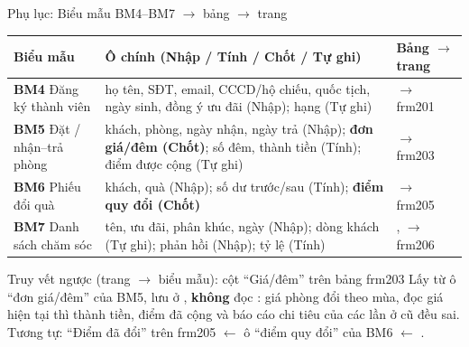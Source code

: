 \begin{frame}{Phụ lục: Biểu mẫu BM4--BM7 $\to$ bảng $\to$ trang \TB}
\scriptsize
\begin{tabularx}{\textwidth}{@{}L{3.0cm}YL{2.4cm}@{}}
\toprule
\textbf{Biểu mẫu} & \textbf{Ô chính (Nhập / Tính / \textbf{Chốt} / Tự ghi)} & \textbf{Bảng $\to$ trang} \\
\midrule
\textcolor{tvB}{\textbf{BM4}} Đăng ký thành viên & họ tên, SĐT, email, CCCD/hộ chiếu, quốc tịch, ngày sinh, đồng ý ưu đãi (Nhập); hạng (Tự ghi) &  $\to$ frm201 \\
\textcolor{tvB}{\textbf{BM5}} Đặt / nhận--trả phòng & khách, phòng, ngày nhận, ngày trả (Nhập); \textbf{đơn giá/đêm (Chốt)}; số đêm, thành tiền (Tính); điểm được cộng (Tự ghi) &  $\to$ frm203 \\
\textcolor{tvB}{\textbf{BM6}} Phiếu đổi quà & khách, quà (Nhập); số dư trước/sau (Tính); \textbf{điểm quy đổi (Chốt)} &  $\to$ frm205 \\
\textcolor{tvB}{\textbf{BM7}} Danh sách chăm sóc & tên, ưu đãi, phân khúc, ngày (Nhập); dòng khách (Tự ghi); phản hồi (Nhập); tỷ lệ (Tính) & ,  $\to$ frm206 \\
\bottomrule
\end{tabularx}

\vspace{2mm}
\begin{block}{Truy vết ngược (trang $\to$ biểu mẫu): cột ``Giá/đêm'' trên bảng frm203}
\scriptsize
Lấy từ ô ``đơn giá/đêm'' của BM5, lưu ở , \textbf{không} đọc : giá phòng đổi theo mùa, đọc giá hiện tại thì thành tiền, điểm đã cộng và báo cáo chi tiêu của các lần ở cũ đều sai. Tương tự: ``Điểm đã đổi'' trên frm205 $\leftarrow$ ô ``điểm quy đổi'' của BM6 $\leftarrow$ .
\end{block}
\end{frame}

